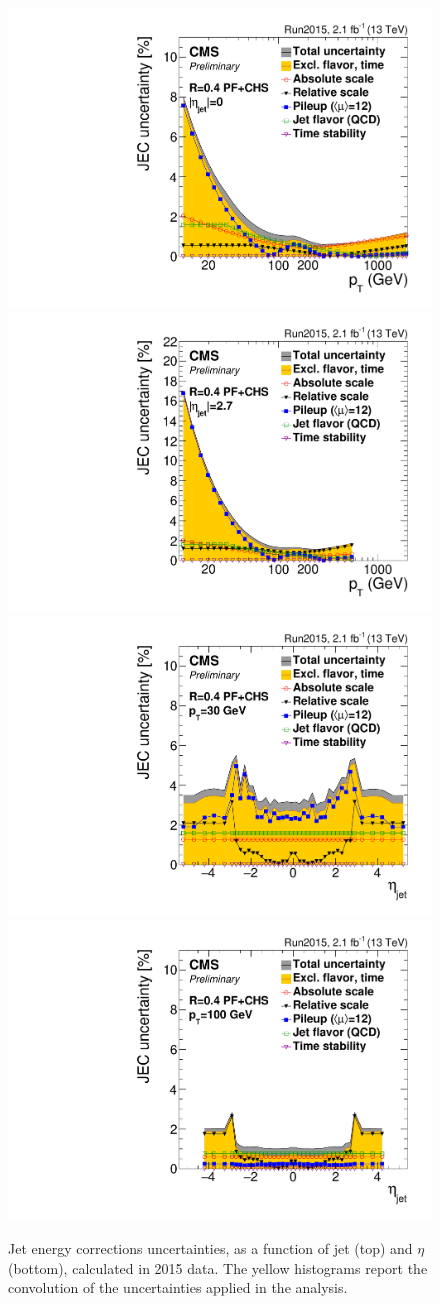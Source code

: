 \begin{figure}[!htb]
  \centering
    \includegraphics[width=.5\textwidth]{figures/JetPlots/JECUncert_DATA_Summary_AK4PFchs_Eta00.pdf}%
    \includegraphics[width=.5\textwidth]{figures/JetPlots/JECUncert_DATA_Summary_AK4PFchs_Eta27.pdf}
\\
    \includegraphics[width=.5\textwidth]{figures/JetPlots/JECUncert_DATA_Summary_AK4PFchs_Pt30.pdf}%
    \includegraphics[width=.5\textwidth]{figures/JetPlots/JECUncert_DATA_Summary_AK4PFchs_Pt100.pdf}

  \caption{Jet energy corrections uncertainties, as a function of jet \pt (top) and $\eta$ (bottom), calculated in 2015 data. The yellow histograms report the convolution of the uncertainties applied in the analysis.~\cite{CMS-DP-2016-020}}
  \label{fig:plot_JEC_unc}
\end{figure}

